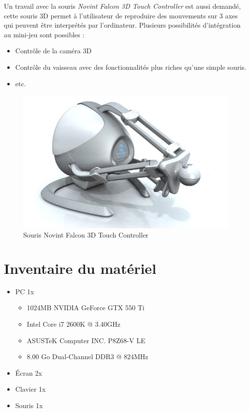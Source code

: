 \documentclass[11pt, a4paper]{article}
\begin{document}
Un travail avec la souris \textit{Novint Falcon 3D Touch Controller} est aussi demandé, cette souris 3D permet à l'utilisateur de reproduire des mouvements sur 3 axes qui peuvent être interprétés par l'ordinateur.
Plusieurs possibilités d'intégration au mini-jeu sont possibles :\\

\begin{itemize}
\item Contrôle de la caméra 3D
\item Contrôle du vaisseau avec des fonctionnalités plus riches qu'une simple souris.
\item etc.
\end{itemize}

\begin{figure}[H]
	\begin{center}
	\includegraphics[scale=.5]{falcon}
	\caption{Souris Novint Falcon 3D Touch Controller}
	\end{center}
\end{figure}
\section{Inventaire du matériel}
\begin{itemize}
\item PC 1x
	\begin{itemize}
	\item 1024MB NVIDIA GeForce GTX 550 Ti
	\item Intel Core i7 2600K @ 3.40GHz
	\item ASUSTeK Computer INC. P8Z68-V LE
	\item 8.00 Go Dual-Channel DDR3 @ 824MHz
	\end{itemize}
\item Écran 2x
\item Clavier 1x
\item Souris 1x
\end{itemize}
\end{document}
